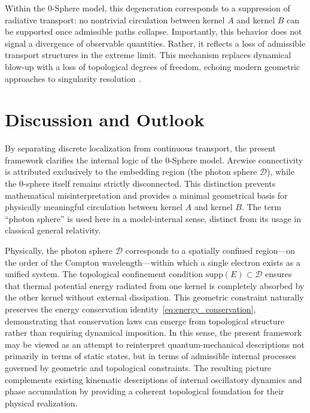 \documentclass[%
 reprint,
 amsmath,amssymb,
 aps,
 prb,
]{revtex4-2}
\numberwithin{equation}{section}
\begin{document}
Within the 0-Sphere model, this degeneration corresponds to a suppression of radiative transport:
no nontrivial circulation between kernel $A$ and kernel $B$ can be supported once admissible paths collapse.
Importantly, this behavior does not signal a divergence of observable quantities.
Rather, it reflects a loss of admissible transport structures in the extreme limit.
This mechanism replaces dynamical blow-up with a loss of topological degrees of freedom, echoing modern geometric approaches to singularity resolution \cite{Penrose1965,Ashtekar2005}.


\section{Discussion and Outlook}
\label{sec:discussion}

By separating discrete localization from continuous transport, the present framework clarifies the internal logic of the 0-Sphere model.
Arcwise connectivity is attributed exclusively to the embedding region (the photon sphere $\mathcal{D}$), while the 0-sphere itself remains strictly disconnected.
This distinction prevents mathematical misinterpretation and provides a minimal geometrical basis for physically meaningful circulation between kernel $A$ and kernel $B$.
The term ``photon sphere'' is used here in a model-internal sense, distinct from its usage in classical general relativity.

Physically, the photon sphere $\mathcal{D}$ corresponds to a spatially confined region—on the order of the Compton wavelength—within which a single electron exists as a unified system.
The topological confinement condition $\mathrm{supp}(E) \subset \mathcal{D}$ ensures that thermal potential energy radiated from one kernel is completely absorbed by the other kernel without external dissipation.
This geometric constraint naturally preserves the energy conservation identity~\eqref{eq:energy_conservation}, demonstrating that conservation laws can emerge from topological structure rather than requiring dynamical imposition.
In this sense, the present framework may be viewed as an attempt to reinterpret quantum-mechanical descriptions not primarily in terms of static states, but in terms of admissible internal processes governed by geometric and topological constraints.
The resulting picture complements existing kinematic descriptions of internal oscillatory dynamics and phase accumulation by providing a coherent topological foundation for their physical realization.
\end{document}
